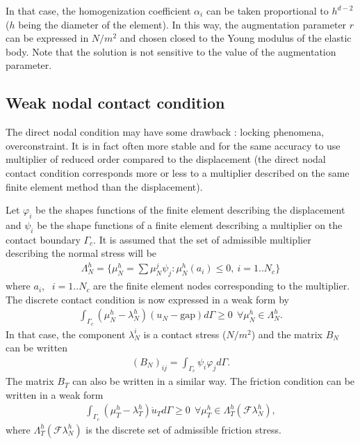 \documentclass[a4paper,11pt,english]{sphinxmanual}
\begin{document}
In that case, the homogenization coefficient \(\alpha_i\) can be taken proportional to \(h^{d-2}\) (\(h\) being the diameter of the element). In this way, the augmentation parameter \(r\) can be expressed in \(N/m^2\) and chosen closed to the Young modulus of the elastic body. Note that the solution is not sensitive to the value of the augmentation parameter.


\subsection{Weak nodal contact condition}
\label{\detokenize{userdoc/model_contact_friction:weak-nodal-contact-condition}}
The direct nodal condition may have some drawback : locking phenomena, over\sphinxhyphen{}constraint. It is in fact often more stable and for the same accuracy to use multiplier of reduced order compared to the displacement (the direct nodal contact condition corresponds more or less to a multiplier described on the same finite element method than the displacement).

Let \(\varphi_i\) be the shapes functions of the finite element describing the displacement and \(\psi_i\) be the shape functions of a finite element describing a multiplier on the contact boundary \(\Gamma_c\). It is assumed that the set of admissible multiplier describing the normal stress will be
\begin{equation*}
\begin{split}\Lambda_N^h = \{ \mu^h_N = \sum \mu^j_N \psi_j : \mu^h_N(a_i) \le 0, ~i = 1..N_c \}\end{split}
\end{equation*}
where \(a_i\), \(~~i=1..N_c\) are the finite element nodes corresponding to the multiplier. The discrete contact condition is now expressed in a weak form by
\begin{equation*}
\begin{split}\int_{\Gamma_c} (\mu_N^h - \lambda_N^h) (u_N - \text{gap}) d\Gamma \ge 0 ~~ \forall \mu_N^h \in \Lambda_N^h.\end{split}
\end{equation*}
In that case, the component \(\lambda_N^i\) is a contact stress (\(N/m^2\)) and the matrix \(B_N\) can be written
\begin{equation*}
\begin{split}(B_N)_{ij} = \int_{\Gamma_c} \psi_i \varphi_j d\Gamma.\end{split}
\end{equation*}
The matrix \(B_T\) can also be written in a similar way. The friction condition can be written in a weak form
\begin{equation*}
\begin{split}\int_{\Gamma_c} (\mu_T^h - \lambda_T^h) \dot{u}_T d\Gamma \ge 0 ~~ \forall \mu_T^h \in \Lambda_T^h({\mathscr F}\lambda_N^h),\end{split}
\end{equation*}
where \(\Lambda_T^h({\mathscr F}\lambda_N^h)\) is the discrete set of admissible friction stress.
\end{document}
